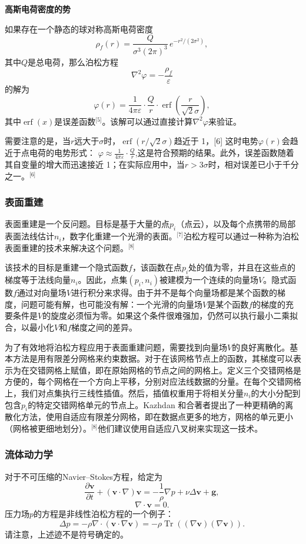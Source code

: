 \textbf{高斯电荷密度的势}

如果存在一个静态的球对称高斯电荷密度  
\[
\rho_f(r) = \frac{Q}{\sigma^3 (2\pi)^{3}}\, e^{-r^2 / (2\sigma^2)},~
\]  
其中\(Q\)是总电荷，那么泊松方程  
\[
\nabla^2 \varphi = -\frac{\rho_f}{\varepsilon}~
\]  
的解为  
\[
\varphi(r) = \frac{1}{4\pi \varepsilon} \cdot \frac{Q}{r} \cdot \operatorname{erf} \left( \frac{r}{\sqrt{2}\sigma} \right),~
\]  
其中\(\operatorname{erf}(x)\)是误差函数\(^\text{[5]}\)。该解可以通过直接计算\(\nabla^2 \varphi\)来验证。

需要注意的是，当\(r\)远大于\(\sigma\)时，\(\operatorname{erf}(r / \sqrt{2} \sigma)\)趋近于 1，[6] 这时电势\(\varphi(r)\)会趋近于点电荷的电势形式：
\(\varphi \approx \frac{1}{4\pi \varepsilon} \cdot \frac{Q}{r}\),这是符合预期的结果。此外，误差函数随着其自变量的增大而迅速接近 1；在实际应用中，当\(r > 3\sigma\)时，相对误差已小于千分之一。\(^\text{[6]}\)
\subsubsection{表面重建}
表面重建是一个反问题。目标是基于大量的点\(p_i\)（点云），以及每个点携带的局部表面法线估计\(n_i\)，数字化重建一个光滑的表面。\(^\text{[7]}\)泊松方程可以通过一种称为泊松表面重建的技术来解决这个问题。\(^\text{[8]}\)

该技术的目标是重建一个隐式函数\(f\)，该函数在点\(p_i\)处的值为零，并且在这些点的梯度等于法线向量\(n_i\)。因此，点集\((p_i, n_i)\)被建模为一个连续的向量场\(V\)。隐式函数\(f\)通过对向量场\(V\)进行积分来求得。由于并不是每个向量场都是某个函数的梯度，问题可能有解，也可能没有解：一个光滑的向量场\(V\)是某个函数\(f\)的梯度的充要条件是\(V\)的旋度必须恒为零。如果这个条件很难强加，仍然可以执行最小二乘拟合，以最小化\(V\)和\(f\)梯度之间的差异。

为了有效地将泊松方程应用于表面重建问题，需要找到向量场\(V\)的良好离散化。基本方法是用有限差分网格来约束数据。对于在该网格节点上的函数，其梯度可以表示为在交错网格上赋值，即在原始网格的节点之间的网格上。定义三个交错网格是方便的，每个网格在一个方向上平移，分别对应法线数据的分量。在每个交错网格上，我们对点集执行三线性插值。然后，插值权重用于将相关分量\(n_i\)的大小分配到包含\(p_i\)的特定交错网格单元的节点上。Kazhdan 和合著者提出了一种更精确的离散化方法，使用自适应有限差分网格，即在数据点更多的地方，网格的单元更小（网格被更细地划分）。\(^\text{[8]}\)他们建议使用自适应八叉树来实现这一技术。
\subsubsection{流体动力学}
对于不可压缩的Navier–Stokes方程，给定为  
\[
\frac{\partial \mathbf{v}}{\partial t} + (\mathbf{v} \cdot \nabla) \mathbf{v} = -\frac{1}{\rho} \nabla p + \nu \Delta \mathbf{v} + \mathbf{g},~
\]
\[
\nabla \cdot \mathbf{v} = 0.~
\]
压力场\(p\)的方程是非线性泊松方程的一个例子：  
\[
\Delta p = -\rho \nabla \cdot (\mathbf{v} \cdot \nabla \mathbf{v}) = -\rho \operatorname{Tr} \left( (\nabla \mathbf{v})(\nabla \mathbf{v}) \right).~
\]  
请注意，上述迹不是符号确定的。

